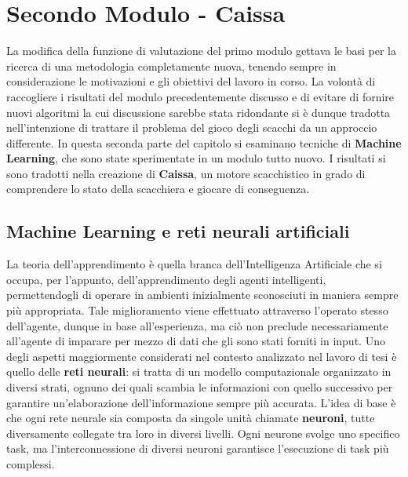 \section{Secondo Modulo - Caissa}
\label{cap: caissa}
La modifica della funzione di valutazione del primo modulo gettava le basi per la ricerca di una metodologia completamente nuova, tenendo sempre in considerazione le motivazioni e gli obiettivi del lavoro in corso. La volontà di raccogliere i risultati del modulo precedentemente discusso e di evitare di fornire nuovi algoritmi la cui discussione sarebbe stata ridondante si è dunque tradotta nell'intenzione di trattare il problema del gioco degli scacchi da un approccio differente. In questa seconda parte del capitolo si esaminano tecniche di \textbf{Machine Learning}, che sono state sperimentate in un modulo tutto nuovo. I risultati si sono tradotti nella creazione di \textbf{Caissa}, un motore scacchistico in grado di comprendere lo stato della scacchiera e giocare di conseguenza.

\subsection{Machine Learning e reti neurali artificiali}
La teoria dell'apprendimento è quella branca dell'Intelligenza Artificiale che si occupa, per l'appunto, dell'apprendimento degli agenti intelligenti, permettendogli di operare in ambienti inizialmente sconosciuti in maniera sempre più appropriata. Tale miglioramento viene effettuato attraverso l'operato stesso dell'agente, dunque in base all'esperienza, ma ciò non preclude necessariamente all'agente di imparare per mezzo di dati che gli sono stati forniti in input.
Uno degli aspetti maggiormente considerati nel contesto analizzato nel lavoro di tesi è quello delle \textbf{reti neurali}: si tratta di un modello computazionale organizzato in diversi strati, ognuno dei quali scambia le informazioni con quello successivo per garantire un'elaborazione dell'informazione sempre più accurata. 
L'idea di base è che ogni rete neurale sia composta da singole unità chiamate \textbf{neuroni}, tutte diversamente collegate tra loro in diversi livelli. Ogni neurone svolge uno specifico task, ma l'interconnessione di diversi neuroni garantisce l'esecuzione di task più complessi. 
